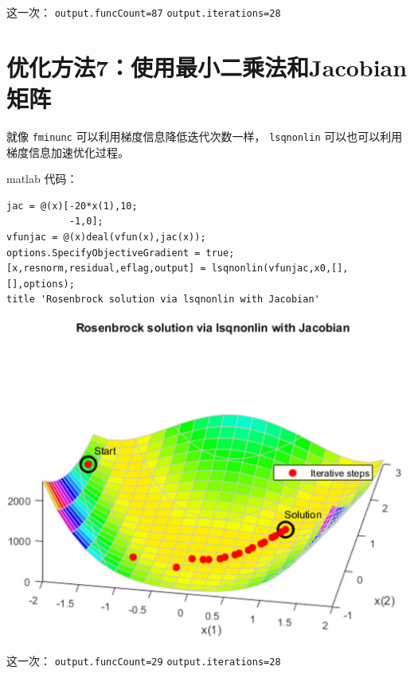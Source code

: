 \documentclass[10pt,a4paper,UTF8]{article}
\begin{document}
这一次： \texttt{output.funcCount=87} \texttt{output.iterations=28}
\section{优化方法7：使用最小二乘法和Jacobian矩阵}
\label{sec:orge341d51}


就像 \texttt{fminunc} 可以利用梯度信息降低迭代次数一样， \texttt{lsqnonlin} 可以也可以利用梯度信息加速优化过程。

matlab 代码：
\lstset{language=matlab,label= ,caption= ,captionpos=b,numbers=none}
\begin{lstlisting}
jac = @(x)[-20*x(1),10;
           -1,0];
vfunjac = @(x)deal(vfun(x),jac(x));
options.SpecifyObjectiveGradient = true;
[x,resnorm,residual,eflag,output] = lsqnonlin(vfunjac,x0,[],[],options);
title 'Rosenbrock solution via lsqnonlin with Jacobian'
\end{lstlisting}


\begin{center}
\includegraphics[width=.9\linewidth]{../../img/communication_matlab/20171014rosenbrockfminunc6.png}
\end{center}

这一次： \texttt{output.funcCount=29} \texttt{output.iterations=28}
\end{document}
